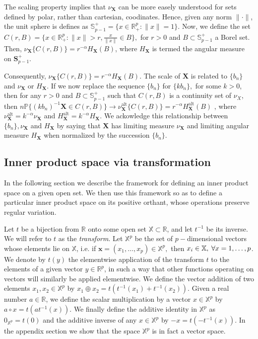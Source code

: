 \documentclass[11pt, oneside]{book}
\theoremstyle{plain}
\theoremstyle{remark}
\begin{document}
The scaling property implies that $\nu_\mathbf{X}$ can be more easely understood
for sets defined by polar, rather than cartesian, coodinates. Hence, given any
norm $\lVert\cdot\lVert$, the unit sphere is defines as $\mathbb{S}_{p-1}^+=
\{x\in \mathbb{R}^p_+: \lVert x\lVert=1\}.$ Now, we define the set $C(r,B) =
\{x\in\mathbb{R}^p_+: \lVert x\lVert >r, \frac{x}{\lVert x\lVert}\in B\},$ for
$r>0$ and $B\subset \mathbb{S}_{p-1}^+$ a Borel set. Then,
$\nu_\mathbf{X}\{C(r,B)\} = r^{-\alpha}H_\mathbf{X}(B)$, where $H_\mathbf{X}$ is
termed the angular measure on $\mathbf{S}^+_{p-1}$.

Consequently, $\nu_\mathbf{X}\{C(r,B)\} = r^{-\alpha}H_\mathbf{X}(B).$ The scale
of $\mathbf{X}$ is related to $\{b_n\}$ and $\nu_\mathbf{X}$ or $H_\mathbf{X}$.
If we now replace the sequence $\{b_n\}$ for $\{kb_n\},$ for some $k>0$, then
for any $r>0$ and $B\subset\mathbb{S}_{p-1}^+$ such that $C(r,B)$ is a
continuity set of $\nu_X$, then $n\mathbb{P}\{(kb_n)^{-1}\mathbf{X}\in C(r,B)\}
\to \nu_\mathbf{X}^\text{alt}\{C(r,B)\} = r^{-\alpha}H_\mathbf{X}^\text{alt}(B)$
, where $\nu_\mathbf{X}^\text{alt} = k^{-\alpha}\nu_\mathbf{X}$ and
$H_\mathbf{X}^\text{alt} = k^{-\alpha}H_\mathbf{X}$. We ackowledge this
relationship between $\{b_n\}, \nu_\mathbf{X}$ and $H_\mathbf{X}$ by saying that
$\mathbf{X}$ has limiting measure $\nu_\mathbf{X}$ and limiting angular measure
$H_\mathbf{X}$ when normalized by the succession $\{b_n\}$.

\subsection{Inner product space via transformation}
In the following section we describe the framework for defining an inner product
space on a given open set. We then use this framework so as to define a
particular inner product space on its positive orthant, whose operations
preserve regular variation. 

Let $t$ be a bijection from $\mathbb{R}$ onto some open set $\mathbb{X}\subset
\mathbb{R}$, and let $t^{-1}$ be its inverse. We will refer to $t$ as the
\emph{transform}. Let $\mathbb{X}^p$ be the set of $p-$dimensional vectors whose
elements lie on $\mathbb{X}$, i.e. if $\mathbf{x} = (x_1,\dots,x_p)
\in\mathbb{X}^p,$ then $x_i\in\mathbb{X},\hspace{0.25em}\forall x=1,\dots,p$. We
denote by $t(y)$ the elementwise application of the transform $t$ to the
elements of a given vector $y\in\mathbb{R}^p$, in such a way that other
functions operating on vectors will similarly be applied elementwise. We define
the vector addition of two elements $x_1,x_2\in\mathbb{X}^p$ by $x_1\oplus x_2 =
t\left(t^{-1}(x_1) + t^{-1}(x_2)\right).$ Given a real number $a\in\mathbb{R}$,
we define the scalar multiplication by a vector $x\in\mathbb{X}^p$ by $a\circ x
= t\left(at^{-1}(x)\right).$ We finally define the additive identity in
$\mathbb{X}^p$ as $0_{\mathbb{X}^p} = t(0)$ and the additive inverse of any
$x\in\mathbb{X}^p$ by $-x = t\left(-t^{-1}(x)\right)$. In the appendix section
\label{sec:vec-space} we show that the space $\mathbb{X}^p$ is in fact a vector
space.
\end{document}
